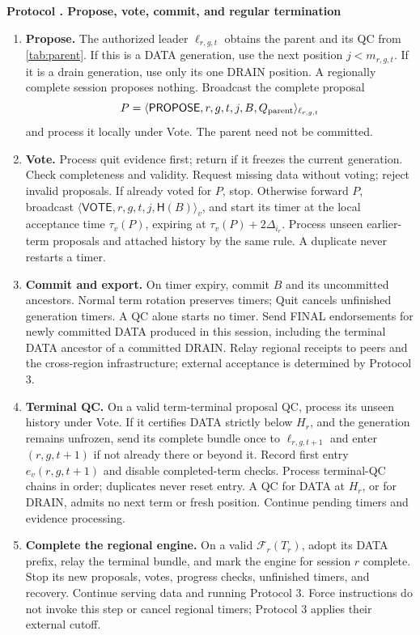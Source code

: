 \documentclass[11pt,a4paper]{article}
\newcommand{\RR}[1]{{\color{rrRed}#1}}
\newcommand{\FC}{\mathcal F}
\newcommand{\Hash}{\mathsf H}
\newcommand{\tagg}[1]{\ensuremath{\mathsf{#1}}}
\newcounter{protocol}
\newenvironment{protocol}[2]{\refstepcounter{protocol}\label{#1}
\begin{mdframed}[nobreak=true,linewidth=.6pt,skipabove=8pt,skipbelow=8pt,
innertopmargin=7pt,innerbottommargin=7pt]\small
\textbf{Protocol \theprotocol. #2}\par\smallskip}{\end{mdframed}}
\begin{document}
\begin{protocol}{alg:steady}{Propose, vote, commit, and regular termination}
\begin{enumerate}[label=\textbf{\arabic*)},itemsep=5pt]
\item \textbf{Propose.} The authorized leader $\ell_{r,g,t}$ obtains the
parent and its QC from \cref{tab:parent}. \RR{If this is a DATA generation,
use the next position $j<m_{r,g,t}$. If it is a drain generation, use only
its one DRAIN position. A regionally complete session proposes nothing.}
Broadcast the complete proposal
\[
 P=\langle\tagg{PROPOSE},r,g,t,j,B,Q_{\rm parent}\rangle_{\ell_{r,g,t}}
\]
and process it locally under Vote. The parent need not be committed.

\item \textbf{Vote.} Process quit evidence first; return if it freezes
the current generation. Check completeness and validity. Request missing
data without voting; reject invalid proposals. If already voted for $P$,
stop. Otherwise forward $P$, broadcast
\RR{$\langle\tagg{VOTE},r,g,t,j,\Hash(B)\rangle_v$}, and start its
timer at the local acceptance time $\tau_v(P)$, expiring at
\RR{$\tau_v(P)+2\Delta_{i_r}$}. Process unseen earlier-term proposals
and attached history by the same rule. A duplicate never restarts a timer.

\item \textbf{Commit and export.} On timer expiry, commit $B$ and its
uncommitted ancestors. Normal term rotation preserves timers; Quit cancels
unfinished generation timers. A QC alone starts no timer.
\RR{Send FINAL endorsements for newly committed DATA produced in this
session, including the terminal DATA ancestor of a committed DRAIN.
Relay regional receipts to peers and the cross-region infrastructure;
external acceptance is determined by Protocol 3.}

\item \textbf{Terminal QC.} On a valid term-terminal proposal QC, process
its unseen history under Vote. \RR{If it certifies DATA strictly below
$H_r$}, and the generation remains unfrozen, send its complete bundle
once to $\ell_{r,g,t+1}$ and enter $(r,g,t+1)$ if not already there or
beyond it. Record first entry $e_v(r,g,t+1)$ and disable completed-term
checks. Process terminal-QC chains in order; duplicates never reset entry.
\RR{A QC for DATA at $H_r$, or for DRAIN, admits no next term or fresh
position. Continue pending timers and evidence processing.}

\item \RR{\textbf{Complete the regional engine.} On a valid $\FC_r(T_r)$,
adopt its DATA prefix, relay the terminal bundle, and mark the engine for
session $r$ complete. Stop its new proposals, votes, progress checks,
unfinished timers, and recovery. Continue serving data and running
Protocol 3. Force instructions do not invoke this step or cancel
regional timers; Protocol 3 applies their external cutoff.}
\end{enumerate}
\end{protocol}
\end{document}

